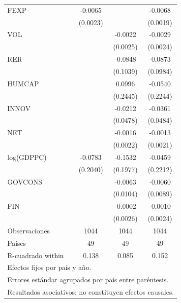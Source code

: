 {\begin{tabular}{l*{3}{c}}
FEXP                &     -0.0065\sym{***}&                     &     -0.0068\sym{***}\\
                    &    (0.0023)         &                     &    (0.0019)         \\
\addlinespace
VOL                 &                     &     -0.0022         &     -0.0029         \\
                    &                     &    (0.0025)         &    (0.0024)         \\
\addlinespace
RER                 &                     &     -0.0848         &     -0.0873         \\
                    &                     &    (0.1039)         &    (0.0984)         \\
\addlinespace
HUMCAP              &                     &      0.0996         &     -0.0540         \\
                    &                     &    (0.2445)         &    (0.2244)         \\
\addlinespace
INNOV               &                     &     -0.0212         &     -0.0361         \\
                    &                     &    (0.0478)         &    (0.0484)         \\
\addlinespace
NET                 &                     &     -0.0016         &     -0.0013         \\
                    &                     &    (0.0022)         &    (0.0021)         \\
\addlinespace
log(GDPPC)          &     -0.0783         &     -0.1532         &     -0.0459         \\
                    &    (0.2040)         &    (0.1977)         &    (0.2212)         \\
\addlinespace
GOVCONS             &                     &     -0.0063         &     -0.0060         \\
                    &                     &    (0.0104)         &    (0.0089)         \\
\addlinespace
FIN                 &                     &     -0.0002         &     -0.0010         \\
                    &                     &    (0.0026)         &    (0.0024)         \\
\midrule
Observaciones       &        1044         &        1044         &        1044         \\
Países              &          49         &          49         &          49         \\
R-cuadrado within   &       0.138         &       0.085         &       0.152         \\
\bottomrule
\multicolumn{4}{l}{\footnotesize Efectos fijos por país y año.}\\
\multicolumn{4}{l}{\footnotesize Errores estándar agrupados por país entre paréntesis.}\\
\multicolumn{4}{l}{\footnotesize Resultados asociativos; no constituyen efectos causales.}\\
\end{tabular}
}

